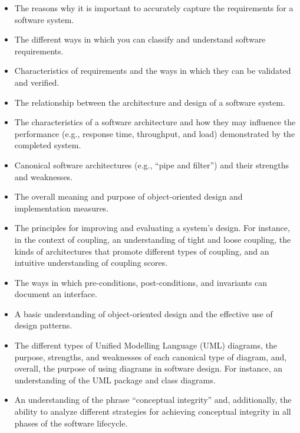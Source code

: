 \documentclass[11pt]{article}
\begin{document}
\begin{itemize}
  \item The reasons why it is important to accurately capture the requirements
    for a software system.

  \item The different ways in which you can classify and understand software
    requirements.

  \item Characteristics of requirements and the ways in which they can be
    validated and verified.

  \item The relationship between the architecture and design of a software
    system.

  \item The characteristics of a software architecture and how they may
    influence the performance (e.g., response time, throughput, and load)
    demonstrated by the completed system.

  \item Canonical software architectures (e.g., ``pipe and filter'') and their
    strengths and weaknesses.

  \item The overall meaning and purpose of object-oriented design and
    implementation measures.

  \item The principles for improving and evaluating a system's design. For
    instance, in the context of coupling, an understanding of tight and loose
    coupling, the kinds of architectures that promote different types of
    coupling, and an intuitive understanding of coupling scores.

  \item The ways in which pre-conditions, post-conditions, and invariants can
    document an interface.

  \item A basic understanding of object-oriented design and the effective use of
    design patterns.

  \item The different types of Unified Modelling Language (UML) diagrams, the
    purpose, strengths, and weaknesses of each canonical type of diagram, and,
    overall, the purpose of using diagrams in software design. For instance, an
    understanding of the UML package and class diagrams.

  \item An understanding of the phrase ``conceptual integrity'' and,
    additionally, the ability to analyze different strategies for achieving
    conceptual integrity in all phases of the software lifecycle.


\end{itemize}
\end{document}
